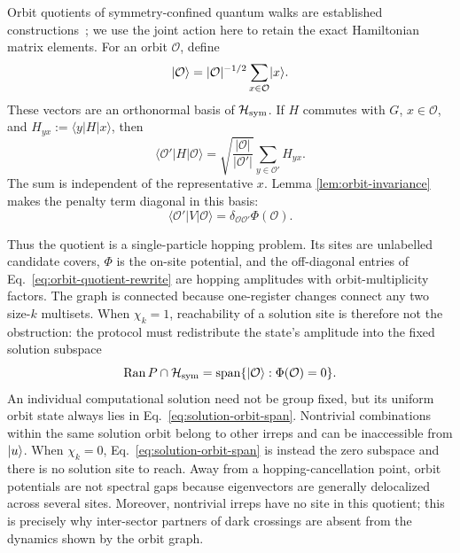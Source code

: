 Orbit quotients of symmetry-confined quantum walks are established
constructions~\cite{KroviBrun2007}; we use the joint action here to retain
the exact Hamiltonian matrix elements.  For an orbit $\mathcal O$, define
\begin{equation}
 \lvert\mathcal O\rangle=|\mathcal O|^{-1/2}
 \sum_{x\in\mathcal O}\lvert x\rangle.
\end{equation}
These vectors are an orthonormal basis of $\mathcal H_{\rm sym}$.  If $H$
commutes with $G$, $x\in\mathcal O$, and
$H_{yx}:=\langle y|H|x\rangle$, then
\begin{equation}
 \langle\mathcal O'|H|\mathcal O\rangle
 =\sqrt{\frac{|\mathcal O|}{|\mathcal O'|}}
 \sum_{y\in\mathcal O'}H_{yx}.
 \label{eq:orbit-quotient-rewrite}
\end{equation}
The sum is independent of the representative $x$.  Lemma
\ref{lem:orbit-invariance} makes the penalty term diagonal in this basis:
\begin{equation}
 \langle\mathcal O'|V|\mathcal O\rangle
 =\delta_{\mathcal O\mathcal O'}\Phi(\mathcal O).
 \label{eq:orbit-potential-diagonal}
\end{equation}

Thus the quotient is a single-particle hopping problem.  Its sites are
unlabelled candidate covers, $\Phi$ is the on-site potential, and the
off-diagonal entries of Eq.~\eqref{eq:orbit-quotient-rewrite} are hopping
amplitudes with orbit-multiplicity factors.  The graph is connected because
one-register changes connect any two size-$k$ multisets.  When $\chi_k=1$,
reachability of a solution site is therefore not the obstruction: the protocol must
redistribute the state's amplitude into the fixed solution subspace
\begin{equation}
 \operatorname{Ran} P\cap\mathcal H_{\rm sym}
 =\operatorname{span}\{\lvert\mathcal O\rangle:\Phi(\mathcal O)=0\}.
 \label{eq:solution-orbit-span}
\end{equation}
An individual computational solution need not be group fixed, but its
uniform orbit state always lies in Eq.~\eqref{eq:solution-orbit-span}.
Nontrivial combinations within the same solution orbit belong to other
irreps and can be inaccessible from $\lvert u\rangle$.
When $\chi_k=0$, Eq.~\eqref{eq:solution-orbit-span} is instead the zero
subspace and there is no solution site to reach.
Away from a hopping-cancellation point, orbit potentials are not spectral
gaps because eigenvectors are generally delocalized across several sites.
Moreover, nontrivial irreps have no site in this quotient; this is precisely
why inter-sector partners of dark crossings are absent from the dynamics
shown by the orbit graph.

